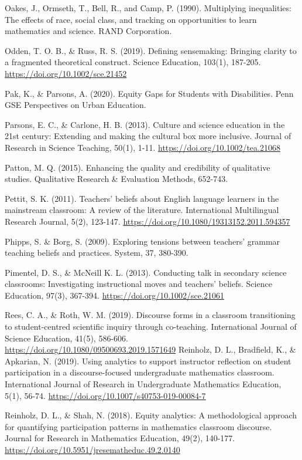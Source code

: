 \documentclass{sig-alternate} %
\begin{document}
Oakes, J., Ormseth, T., Bell, R., and Camp, P. (1990). Multiplying inequalities: The effects of race, social class, and tracking on opportunities to learn mathematics and science. RAND Corporation.

Odden, T. O. B., \& Russ, R. S. (2019). Defining sensemaking: Bringing clarity to a fragmented theoretical construct. Science Education, 103(1), 187-205. \url{https://doi.org/10.1002/sce.21452}

Pak, K., \& Parsons, A. (2020). Equity Gaps for Students with Disabilities. Penn GSE Perspectives on Urban Education.

Parsons, E. C., \& Carlone, H. B. (2013). Culture and science education in the 21st century: Extending and making the cultural box more inclusive. Journal of Research in Science Teaching, 50(1), 1-11. \url{https://doi.org/10.1002/tea.21068}

Patton, M. Q. (2015). Enhancing the quality and credibility of qualitative studies. Qualitative Research \& Evaluation Methods, 652-743.

Pettit, S. K. (2011). Teachers' beliefs about English language learners in the mainstream classroom: A review of the literature. International Multilingual Research Journal, 5(2), 123-147. \url{https://doi.org/10.1080/19313152.2011.594357}

Phipps, S. \& Borg, S. (2009). Exploring tensions between teachers’ grammar teaching beliefs and practices. System, 37, 380-390.

Pimentel, D. S., \& McNeill K. L. (2013). Conducting talk in secondary science classrooms: Investigating instructional moves and teachers’ beliefs. Science Education, 97(3), 367-394. \url{https://doi.org/10.1002/sce.21061}

Rees, C. A., \& Roth, W. M. (2019). Discourse forms in a classroom transitioning to student-centred scientific inquiry through co-teaching. International Journal of Science Education, 41(5), 586-606. \url{https://doi.org/10.1080/09500693.2019.1571649}
\newpage
Reinholz, D. L., Bradfield, K., \& Apkarian, N. (2019). Using analytics to support instructor reflection on student participation in a discourse-focused undergraduate mathematics classroom. International Journal of Research in Undergraduate Mathematics Education, 5(1), 56-74. \url{https://doi.org/10.1007/s40753-019-00084-7}

Reinholz, D. L., \& Shah, N. (2018). Equity analytics: A methodological approach for quantifying participation patterns in mathematics classroom discourse. Journal for Research in Mathematics Education, 49(2), 140-177. \url{https://doi.org/10.5951/jresematheduc.49.2.0140}
\end{document}
